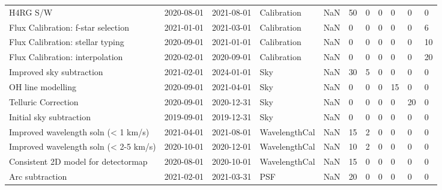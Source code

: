 \begin{longtable}{llllp{2cm}llllll}
                                    H4RG S/W &  2020-08-01 &  2021-08-01 &    Calibration &                      NaN &     50 &       0 &        0 &       0 &     0 &          0 \\
          Flux Calibration: f-star selection &  2021-01-01 &  2021-03-01 &    Calibration &                      NaN &      0 &       0 &        0 &       0 &     0 &          6 \\
            Flux Calibration: stellar typing &  2020-09-01 &  2021-01-01 &    Calibration &                      NaN &      0 &       0 &        0 &       0 &     0 &         10 \\
             Flux Calibration: interpolation &  2020-02-01 &  2020-09-01 &    Calibration &                      NaN &      0 &       0 &        0 &       0 &     0 &         20 \\
                    Improved sky subtraction &  2021-02-01 &  2024-01-01 &            Sky &                      NaN &     30 &       5 &        0 &       0 &     0 &          0 \\
                           OH line modelling &  2020-09-01 &  2021-04-01 &            Sky &                      NaN &      0 &       0 &        0 &      15 &     0 &          0 \\
                         Telluric Correction &  2020-09-01 &  2020-12-31 &            Sky &                      NaN &      0 &       0 &        0 &       0 &    20 &          0 \\
                     Initial sky subtraction &  2019-09-01 &  2019-12-31 &            Sky &                      NaN &      0 &       0 &        0 &       0 &     0 &          0 \\
         Improved wavelength soln (< 1 km/s) &  2021-04-01 &  2021-08-01 &  WavelengthCal &                      NaN &     15 &       2 &        0 &       0 &     0 &          0 \\
       Improved wavelength soln (< 2-5 km/s) &  2020-10-01 &  2020-12-01 &  WavelengthCal &                      NaN &     10 &       2 &        0 &       0 &     0 &          0 \\
         Consistent 2D model for detectormap &  2020-08-01 &  2020-10-01 &  WavelengthCal &                      NaN &     15 &       0 &        0 &       0 &     0 &          0 \\
                             Arc subtraction &  2021-02-01 &  2021-03-31 &            PSF &                      NaN &     20 &       0 &        0 &       0 &     0 &          0 \\

\end{longtable}
